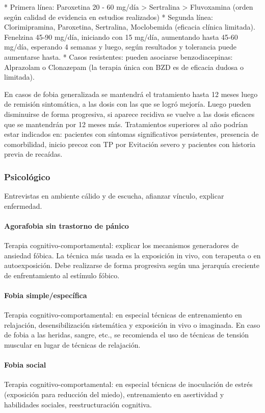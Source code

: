 * Primera línea: Paroxetina 20 - 60 mg/día > Sertralina > Fluvoxamina (orden según calidad de evidencia en estudios realizados)
* Segunda línea: Clorimipramina, Paroxetina, Sertralina, Moclobemida (eficacia clínica limitada). Fenelzina 45-90 mg/día, iniciando con 15 mg/día, aumentando hasta 45-60 mg/día, esperando 4 semanas y luego, según resultados y tolerancia puede aumentarse hasta.
* Casos resistentes: pueden asociarse benzodiacepinas: Alprazolam o Clonazepam (la terapia única con BZD es de eficacia dudosa o limitada).

En casos de fobia generalizada se mantendrá el tratamiento hasta 12 meses luego de remisión sintomática, a las dosis con las que se logró mejoría. Luego pueden disminuirse de forma progresiva, si aparece recidiva se vuelve a las dosis eficaces que se mantendrán por 12 meses más. Tratamientos superiores al año podrían estar indicados en: pacientes con síntomas significativos persistentes, presencia de comorbilidad, inicio precoz con TP por Evitación severo y pacientes con historia previa de recaídas.

\subsubsection*{Psicológico}
Entrevistas en ambiente cálido y de escucha, afianzar vínculo, explicar enfermedad.
\paragraph*{Agorafobia sin trastorno de pánico}
Terapia cognitivo-comportamental: explicar los mecanismos generadores de ansiedad fóbica. La técnica más usada es la exposición in vivo, con terapeuta o en autoexposición. Debe realizarse de forma progresiva según una jerarquía creciente de enfrentamiento al estímulo fóbico.
\paragraph*{Fobia simple/específica}
Terapia cognitivo-comportamental: en especial técnicas de entrenamiento en relajación, desensibilización sistemática y exposición in vivo o imaginada. En caso de fobia a las heridas, sangre, etc., se recomienda el uso de técnicas de tensión muscular en lugar de técnicas de relajación.
\paragraph*{Fobia social}
Terapia cognitivo-comportamental: en especial técnicas de inoculación de estrés (exposición para reducción del miedo), entrenamiento en asertividad y habilidades sociales, reestructuración cognitiva.
